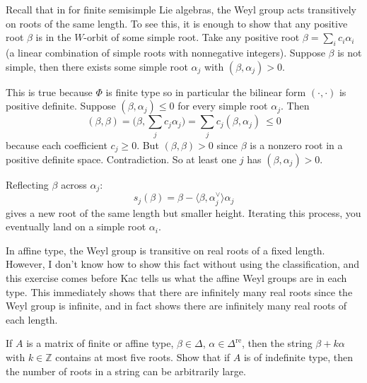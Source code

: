 \documentclass[12pt]{article}
\begin{document}
\begin{remark}
    Recall that in for finite semisimple Lie algebras, the Weyl group acts transitively on roots of the same length. To see this, it is enough to show that any positive root $\beta$ is in the $W$-orbit of some simple root. Take any positive root $\beta=\sum_i c_i\alpha_i$ (a linear combination of simple roots with nonnegative integers).
    Suppose $\beta$ is not simple, then there exists some simple root $\alpha_j$ with $(\beta,\alpha_j)>0$.

    This is true because $\Phi$ is finite type so in particular the bilinear form $(\cdot,\cdot)$ is positive definite.
    Suppose $(\beta,\alpha_j)\leq 0$ for every simple root $\alpha_j$. Then
    \[
        (\beta,\beta) = \Big(\beta,\sum_j c_j\alpha_j\Big) = \sum_j c_j(\beta,\alpha_j)\ \leq 0
    \]
    because each coefficient $c_j\geq 0$. But $(\beta,\beta)>0$ since $\beta$ is a nonzero root in a positive definite space. Contradiction. So at least one $j$ has $(\beta,\alpha_j)>0$.

    Reflecting $\beta$ across $\alpha_j$:
    \[
        s_j(\beta) = \beta - \langle \beta,\alpha_j^\vee\rangle\alpha_j
    \]
    gives a new root of the same length but smaller height. Iterating this process, you eventually land on a simple root $\alpha_i$.

    In affine type, the Weyl group is transitive on real roots of a fixed length. However, I don't know how to show this fact without using the classification, and this exercise comes before Kac tells us what the affine Weyl groups are in each type. This immediately shows that there are infinitely many real roots since the Weyl group is infinite, and in fact shows there are infinitely many real roots of each length. 
\end{remark}

\begin{exercise}
    If $A$ is a matrix of finite or affine type, $\beta \in \Delta$, $\alpha \in \Delta^{\mathrm{re}}$, then the string $\beta + k \alpha$ with $k \in \mathbb{Z}$ contains at most five roots. Show that if $A$ is of indefinite type, then the number of roots in a string can be arbitrarily large.
\end{exercise}
\end{document}

